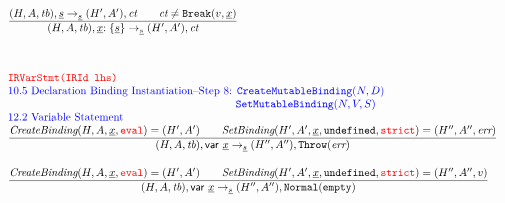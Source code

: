 \[\begin{array}{l@{~~}l@{~~}ll}
\frac{\begin{matrix}
\state, \ir\stmt \rightarrow_{\ir\stmt} \resp, \ct
\rulesep
\ct \not= {\tt Break}(v, \ir{x})
\end{matrix}}{\begin{matrix}
\state, \irlab \rightarrow_{\ir\stmt} \resp, \ct
\end{matrix}}
\\[4em]




\mtt{\normalsize\inred IRVarStmt(IRId lhs)}\\
\mbox{\inblue 10.5 Declaration Binding Instantiation--Step 8:
${\tt CreateMutableBinding}(N,D)$}\\
\mbox{\inblue \phantom{10.5 Declaration Binding Instantiation--Step 8:}
${\tt SetMutableBinding}(N,V,S)$}\\
\mbox{\inblue 12.2 Variable Statement}\\

\frac{\begin{matrix}
\hf{CreateBinding}(H, A, \irid, \eval) = \resp
\rulesep
\hf{SetBinding}(H', A', \irid, \undef, \strict) = (H'', A'', \err)
\end{matrix}}{\begin{matrix}
\state, {\sf var} \ \irid \rightarrow_{\ir\stmt}
\respp, \error
\end{matrix}}\\[2em]

\frac{\begin{matrix}
\hf{CreateBinding}(H, A, \irid, \eval) = \resp
\rulesep
\hf{SetBinding}(H', A', \irid, \undef, \strict) = (H'', A'', v)
\end{matrix}}{\begin{matrix}
\state, {\sf var} \ \irid \rightarrow_{\ir\stmt}
\respp, \void
\end{matrix}}\\[2em]


\end{array}
\]



